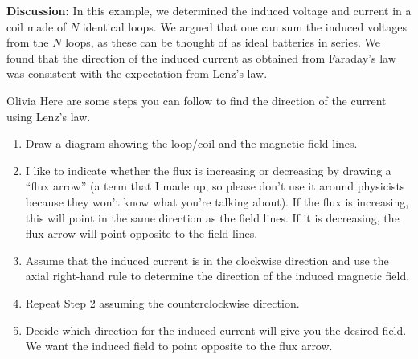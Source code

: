 \begin{example}
\textbf{Discussion: }In this example, we determined the induced voltage and current in a coil made of $N$ identical loops. We argued that one can sum the induced voltages from the $N$ loops, as these can be thought of as ideal batteries in series. We found that the direction of the induced current as obtained from Faraday's law was consistent with the expectation from Lenz's law.
\end{example}

\begin{studentOpinion}{Olivia}
Here are some steps you can follow to find the direction of the current using Lenz's law.
\begin{enumerate}
\item  Draw a diagram showing the loop/coil and the magnetic field lines. 
\item I like to indicate whether the flux is increasing or decreasing by drawing a ``flux arrow'' (a term that I made up, so please don't use it around physicists because they won't know what you're talking about). If the flux is increasing, this will point in the same direction as the field lines. If it is decreasing, the flux arrow will point opposite to the field lines. 
\item Assume that the induced current is in the clockwise direction and use the axial right-hand rule to determine the direction of the induced magnetic field. 
\item Repeat Step 2 assuming the counterclockwise direction.
\item Decide which direction for the induced current will give you the desired field. We want the induced field to point opposite to the flux arrow. 
\end{enumerate}  


\end{studentOpinion}
